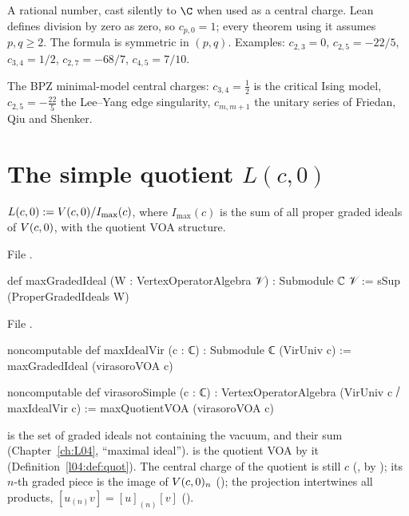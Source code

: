 \begin{dictionary}
A rational number, cast silently to $\C$ when used as a central charge. Lean defines division by zero as
zero, so $c_{p,0} = 1$; every theorem using it assumes $p,q\ge2$. The formula is symmetric in $(p,q)$.
Examples: $c_{2,3} = 0$, $c_{2,5} = -22/5$, $c_{3,4} = 1/2$, $c_{2,7} = -68/7$, $c_{4,5} = 7/10$.
\end{dictionary}

\begin{physics}
The BPZ minimal-model central charges: $c_{3,4} = \frac12$ is the critical Ising model,
$c_{2,5} = -\frac{22}5$ the Lee--Yang edge singularity, $c_{m,m+1}$ the unitary series of Friedan, Qiu
and Shenker.
\end{physics}

\section{The simple quotient \texorpdfstring{$L(c,0)$}{L(c,0)}}\label{l06:sec:simple}

\begin{definition}\label{l06:def:simple}
$L(c,0) := V(c,0)/I_{\max}(c)$, where $I_{\max}(c)$ is the sum of all proper graded ideals of $V(c,0)$,
with the quotient VOA structure.
\end{definition}

File .
\begin{leancode}
def maxGradedIdeal (W : VertexOperatorAlgebra 𝒱) : Submodule ℂ 𝒱 :=
  sSup (ProperGradedIdeals W)
\end{leancode}
File .
\begin{leancode}
noncomputable def maxIdealVir (c : ℂ) : Submodule ℂ (VirUniv c) :=
  maxGradedIdeal (virasoroVOA c)

noncomputable def virasoroSimple (c : ℂ) :
    VertexOperatorAlgebra (VirUniv c ⧸ maxIdealVir c) :=
  maxQuotientVOA (virasoroVOA c)
\end{leancode}

\begin{dictionary}
 is the set of graded ideals not containing the vacuum, and  their
sum (Chapter~\ref{ch:L04}, ``maximal ideal'').  is the quotient VOA by it
(Definition~\ref{l04:def:quot}). The central charge of the quotient is still $c$
(\allowbreak{}, by ); its $n$-th graded piece is the image of $V(c,0)_n$
(); the projection intertwines all products, $[u_{(n)}v] = [u]_{(n)}[v]$
(\allowbreak{}\allowbreak{}).
\end{dictionary}

